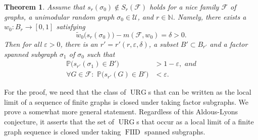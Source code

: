 \documentclass[12pt,a4paper]{article}
\newtheorem{Theorem}{Theorem}
\newcommand{\eps}{\varepsilon}
\newcommand{\F}{\mathcal{F}}
\newcommand{\N}{\mathbb{N}}
\renewcommand{\P}{\mathbb{P}}
\newcommand{\U}{\mathcal{U}}
\renewcommand{\:}{\colon}
\DeclareMathOperator{\URG}{URG}
\DeclareMathOperator{\FIID}{FIID}
\begin{document}
\begin{Theorem} \label{separation2uni}
Assume that $s_r(\sigma_0) \notin S_r(\F)$ holds for a nice family $\F$ of graphs, a unimodular random graph $\sigma_0 \in \U$, and $r\in \N$. 
Namely, there exists a $w_0\: B_r \rightarrow [0, 1]$ satisfying
\begin{equation} \label{deltadef}
\tilde{w}_0\big(s_r(\sigma_0)\big) - m(\F, w_0) = \delta > 0.
\end{equation}
Then for all $\eps > 0$, there is an $r' = r'(r, \eps, \delta)$, a subset $B' \subset B_{r'}$ and a factor spanned subgraph $\sigma_1$ of $\sigma_0$ such that 
\begin{align*}
\P\big(s_{r'}(\sigma_1) \in B'\big) &> 1 -\eps, \,\,and\\
\forall G \in \F\: \,\, \P\big(s_{r'}(G) \in B'\big) &< \eps. 
\end{align*}
\end{Theorem}

For the proof, we need that the class of $\URG$s that can be written as the local limit of a sequence of finite graphs is closed under taking factor subgraphs. 
We prove a somewhat more general statement. 
Regardless of this Aldous-Lyons conjecture, it asserts that the set of $\URG$s that occur as a local limit of a finite graph sequence is closed under taking $\FIID$ spanned subgraphs. 
\end{document}
